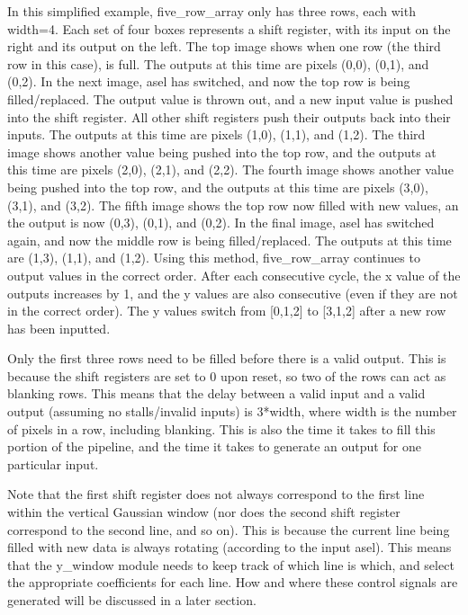 In this simplified example, five\_row\_array only has three rows, each with width=4. Each set of four boxes represents a shift register, with its input on the right and its output on the left. The top image shows when one row (the third row in this case), is full. The outputs at this time are pixels (0,0), (0,1), and (0,2). In the next image, asel has switched, and now the top row is being filled/replaced. The output value is thrown out, and a new input value is pushed into the shift register. All other shift registers push their outputs back into their inputs. The outputs at this time are pixels (1,0), (1,1), and (1,2). The third image shows another value being pushed into the top row, and the outputs at this time are pixels (2,0), (2,1), and (2,2). The fourth image shows another value being pushed into the top row, and the outputs at this time are pixels (3,0), (3,1), and (3,2). The fifth image shows the top row now filled with new values, an the output is now (0,3), (0,1), and (0,2). In the final image, asel has switched again, and now the middle row is being filled/replaced. The outputs at this time are (1,3), (1,1), and (1,2). Using this method, five\_row\_array continues to output values in the correct order. After each consecutive cycle, the x value of the outputs increases by 1, and the y values are also consecutive (even if they are not in the correct order). The y values switch from [0,1,2] to [3,1,2] after a new row has been inputted.

Only the first three rows need to be filled before there is a valid output. This 
is because the shift registers are set to 0 upon reset, so two of the rows can 
act as blanking rows. This means that the delay between a valid input and 
a valid output (assuming no stalls/invalid inputs) is 3*width, where width is 
the number of pixels in a row, including blanking. This is also the time it 
takes to fill this portion of the pipeline, and the time it takes to generate an 
output for one particular input.

Note that the first shift register does not always correspond to the first line 
within the vertical Gaussian window (nor does the second shift register 
correspond to the second line, and so on). This is because the current line 
being filled with new data is always rotating (according to the input asel). 
This means that the y\_window module needs to keep track of which line is which, 
and select the appropriate coefficients for each line. How and where these 
control signals are generated will be discussed in a later section.


